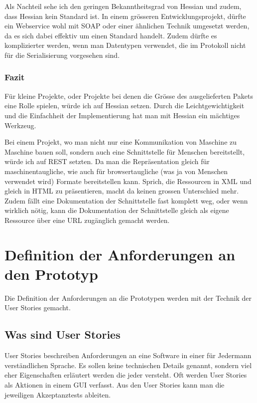 \documentclass[abstracton, listof=totocnumbered,
bibliography=totocnumbered]{scrreprt}
\begin{document}
  Als Nachteil sehe ich den geringen Bekanntheitsgrad von Hessian und zudem,
  dass Hessian kein Standard ist. In einem grösseren Entwicklungsprojekt, dürfte
  ein Webservice wohl mit \ac{SOAP} oder einer ähnlichen Technik umgesetzt
  werden, da es sich dabei effektiv um einen Standard handelt. Zudem dürfte es
  komplizierter werden, wenn man Datentypen verwendet, die im Protokoll nicht
  für die Serialisierung vorgesehen sind.
  
  \subsection{Fazit}
  
  Für kleine Projekte, oder Projekte bei denen die Grösse des ausgelieferten Pakets
  eine Rolle spielen, würde ich auf Hessian setzen. Durch die
  Leichtgewichtigkeit und die Einfachheit der Implementierung hat man mit
  Hessian ein mächtiges Werkzeug.
  
  Bei einem Projekt, wo man nicht nur eine Kommunikation von Maschine zu
  Maschine bauen soll, sondern auch eine Schnittstelle für Menschen
  bereitstellt, würde ich auf \ac{REST} setzten. Da man die Repräsentation
  gleich für maschinentaugliche, wie auch für browsertaugliche (was ja von
  Menschen verwendet wird) Formate bereitstellen kann. Sprich, die Ressourcen in
  \ac{XML} und gleich in \ac{HTML} zu präsentieren, macht da keinen grossen
  Unterschied mehr. Zudem fällt eine Dokumentation der Schnittstelle fast
  komplett weg, oder wenn wirklich nötig, kann die Dokumentation der
  Schnittstelle gleich als eigene Ressource über eine \ac{URL} zugänglich
  gemacht werden.
  
  \newpage
  
  \chapter{Definition der Anforderungen an den Prototyp}
  
  Die Definition der Anforderungen an die Prototypen werden mit der Technik der
  User Sto\-ries\cite{UserStories} gemacht.
  
  \section{Was sind User Stories}
  
  User Stories beschreiben Anforderungen an eine Software in einer für Jedermann
  verständlichen Sprache. Es sollen keine technischen Details genannt, sondern
  viel eher Eigenschaften erläutert werden die jeder versteht. Oft werden User
  Stories als Aktionen in einem \ac{GUI} verfasst. Aus den User Stories kann
  man die jeweiligen Akzeptanztests\cite{AcceptanceTests} ableiten.
  
\end{document}
